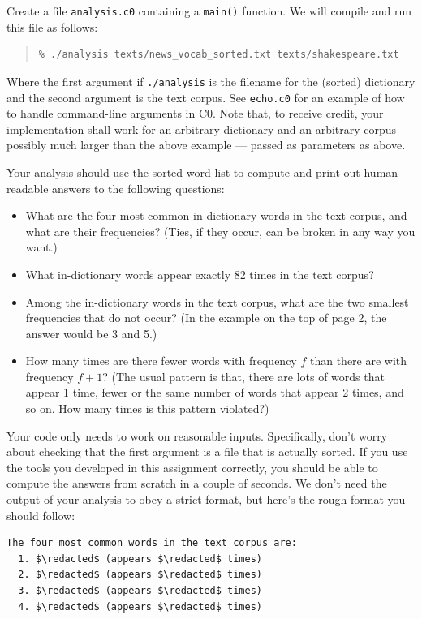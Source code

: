 \documentclass[12pt]{exam}
\newif\ifAnalysisVersionA %
\begin{document}
\begin{task}[6]
  Create a file \lstinline"analysis.c0" containing a
  \lstinline'main()' function. We will compile and run this file as
  follows:
\begin{quote}
\begin{lstlisting}[language={[coin]C}]
% cc0 -w -o analysis lib/*.c0 doslingos.c0 analysis.c0
% ./analysis texts/news_vocab_sorted.txt texts/shakespeare.txt
\end{lstlisting}
\end{quote}
Where the first argument if \lstinline'./analysis' is the filename for the
(sorted) dictionary and the second argument is the text corpus.  See
\lstinline'echo.c0' for an example of how to handle command-line
arguments in C0.  Note that, to receive credit, your implementation
shall work for an arbitrary dictionary and an arbitrary corpus ---
possibly much larger than the above example --- passed
as parameters as above.

Your analysis should use the sorted word list to compute and print out
human-readable answers to the following questions:

\ifAnalysisVersionA
\begin{itemize}
\item What are the four most common in-dictionary words in
  the text corpus, and what are their frequencies?
  (Ties, if they occur, can be broken in any way you want.)
\item What in-dictionary words appear exactly 82 times in the text
  corpus?
\item Among the in-dictionary words in the text corpus, what are the
  two smallest frequencies that do not occur? (In the example on the
  top of page 2, the answer would be 3 and 5.)
\item How many times are there fewer words with frequency $f$ than
  there are with frequency $f+1$? (The usual pattern is that, there
  are lots of words that appear 1 time, fewer or the same number of
  words that appear 2 times, and so on. How many times is this pattern
  violated?)
\end{itemize}

Your code only needs to work on reasonable inputs. Specifically, don't
worry about checking that the first argument is a file that is
actually sorted. If you use the tools you developed in this assignment
correctly, you should be able to compute the answers from scratch in a
couple of seconds.
We don't need the output of your analysis to obey a strict format, but
here's the rough format you should follow:
\begin{lstlisting}[language={[coin]C}, mathescape]
The four most common words in the text corpus are:
  1. $\redacted$ (appears $\redacted$ times)
  2. $\redacted$ (appears $\redacted$ times)
  3. $\redacted$ (appears $\redacted$ times)
  4. $\redacted$ (appears $\redacted$ times)


\end{lstlisting}
\end{task}
\end{document}
